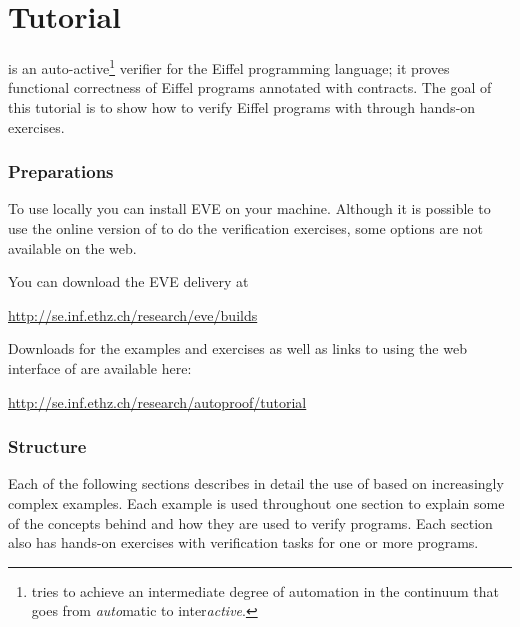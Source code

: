 \chapter{\AutoProof Tutorial}
\label{sec:ap-tutorial}


\AutoProof is an auto-active\footnote{\AutoProof tries to achieve an intermediate degree of automation in the continuum that goes from \emph{auto}matic to inter\emph{active}.} verifier for the Eiffel programming language; it proves functional correctness of Eiffel programs annotated with contracts. The goal of this tutorial is to show how to verify Eiffel programs with \AutoProof through hands-on exercises.

\subsection*{Preparations}

To use \AutoProof locally you can install EVE on your machine. Although it is possible to use the online version of \AutoProof to do the verification exercises, some options are not available on the web.

You can download the EVE delivery at
\begin{center}
\url{http://se.inf.ethz.ch/research/eve/builds}
\end{center}

Downloads for the examples and exercises as well as links to using the web interface of \AutoProof are available here:
\begin{center}
\url{http://se.inf.ethz.ch/research/autoproof/tutorial}
\end{center}


\subsection*{Structure}

Each of the following sections describes in detail the use of \AutoProof based on increasingly complex examples. Each example is used throughout one section to explain some of the concepts behind \AutoProof and how they are used to verify programs. Each section also has hands-on exercises with verification tasks for one or more programs.

